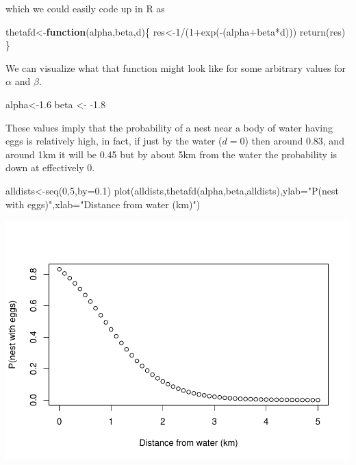 \documentclass[
]{book}
\newenvironment{Shaded}{\begin{snugshade}}{\end{snugshade}}
\newcommand{\AttributeTok}[1]{\textcolor[rgb]{0.77,0.63,0.00}{#1}}
\newcommand{\ControlFlowTok}[1]{\textcolor[rgb]{0.13,0.29,0.53}{\textbf{#1}}}
\newcommand{\DecValTok}[1]{\textcolor[rgb]{0.00,0.00,0.81}{#1}}
\newcommand{\FloatTok}[1]{\textcolor[rgb]{0.00,0.00,0.81}{#1}}
\newcommand{\FunctionTok}[1]{\textcolor[rgb]{0.00,0.00,0.00}{#1}}
\newcommand{\NormalTok}[1]{#1}
\newcommand{\OtherTok}[1]{\textcolor[rgb]{0.56,0.35,0.01}{#1}}
\newcommand{\SpecialCharTok}[1]{\textcolor[rgb]{0.00,0.00,0.00}{#1}}
\newcommand{\StringTok}[1]{\textcolor[rgb]{0.31,0.60,0.02}{#1}}
\begin{document}
which we could easily code up in R as

\begin{Shaded}
\begin{Highlighting}[]
\NormalTok{thetafd}\OtherTok{\textless{}{-}}\ControlFlowTok{function}\NormalTok{(alpha,beta,d)\{}
\NormalTok{  res}\OtherTok{\textless{}{-}}\DecValTok{1}\SpecialCharTok{/}\NormalTok{(}\DecValTok{1}\SpecialCharTok{+}\FunctionTok{exp}\NormalTok{(}\SpecialCharTok{{-}}\NormalTok{(alpha}\SpecialCharTok{+}\NormalTok{beta}\SpecialCharTok{*}\NormalTok{d)))}
  \FunctionTok{return}\NormalTok{(res)}
\NormalTok{\}}
\end{Highlighting}
\end{Shaded}

We can visualize what that function might look like for some arbitrary values for \(\alpha\) and \(\beta\).

\begin{Shaded}
\begin{Highlighting}[]
\NormalTok{alpha}\OtherTok{\textless{}{-}}\FloatTok{1.6}
\NormalTok{beta }\OtherTok{\textless{}{-}} \SpecialCharTok{{-}}\FloatTok{1.8}
\end{Highlighting}
\end{Shaded}

These values imply that the probability of a nest near a body of water having eggs is relatively high, in fact, if just by the water (\(d=0\)) then around 0.83, and around 1km it will be 0.45 but by about 5km from the water the probability is down at effectively 0.

\begin{Shaded}
\begin{Highlighting}[]
\NormalTok{alldists}\OtherTok{\textless{}{-}}\FunctionTok{seq}\NormalTok{(}\DecValTok{0}\NormalTok{,}\DecValTok{5}\NormalTok{,}\AttributeTok{by=}\FloatTok{0.1}\NormalTok{)}
\FunctionTok{plot}\NormalTok{(alldists,}\FunctionTok{thetafd}\NormalTok{(alpha,beta,alldists),}\AttributeTok{ylab=}\StringTok{"P(nest with eggs)"}\NormalTok{,}\AttributeTok{xlab=}\StringTok{"Distance from water (km)"}\NormalTok{)}
\end{Highlighting}
\end{Shaded}

\includegraphics{ECOMODbook_files/figure-latex/ch13.33-1.pdf}
\end{document}
